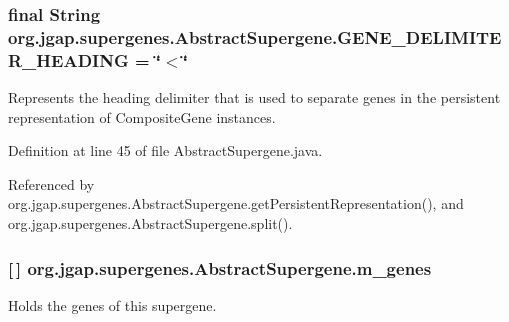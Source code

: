 \hypertarget{classorg_1_1jgap_1_1supergenes_1_1_abstract_supergene_aebbbd0fdd22a6d94c951471c8ae86b84}{
\subsubsection[{G\-E\-N\-E\-\_\-\-D\-E\-L\-I\-M\-I\-T\-E\-R\-\_\-\-H\-E\-A\-D\-I\-N\-G}]{\setlength{\rightskip}{0pt plus 5cm}final String org.\-jgap.\-supergenes.\-Abstract\-Supergene.\-G\-E\-N\-E\-\_\-\-D\-E\-L\-I\-M\-I\-T\-E\-R\-\_\-\-H\-E\-A\-D\-I\-N\-G = \char`\"{}$<$\char`\"{}\hspace{0.3cm}{\ttfamily [static]}}}\label{classorg_1_1jgap_1_1supergenes_1_1_abstract_supergene_aebbbd0fdd22a6d94c951471c8ae86b84}
Represents the heading delimiter that is used to separate genes in the persistent representation of Composite\-Gene instances. 

Definition at line 45 of file Abstract\-Supergene.\-java.



Referenced by org.\-jgap.\-supergenes.\-Abstract\-Supergene.\-get\-Persistent\-Representation(), and org.\-jgap.\-supergenes.\-Abstract\-Supergene.\-split().

\hypertarget{classorg_1_1jgap_1_1supergenes_1_1_abstract_supergene_a7e237a04c314d9fbb0ab064ad88a5cb3}{
\subsubsection[{m\-\_\-genes}]{ \mbox{[}$\,$\mbox{]} org.\-jgap.\-supergenes.\-Abstract\-Supergene.\-m\-\_\-genes\hspace{0.3cm}{\ttfamily [private]}}}\label{classorg_1_1jgap_1_1supergenes_1_1_abstract_supergene_a7e237a04c314d9fbb0ab064ad88a5cb3}
Holds the genes of this supergene. 

